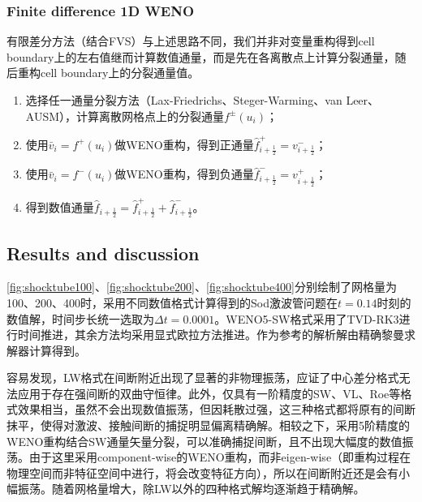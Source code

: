\documentclass[11pt]{article}
\begin{document}
\subsubsection{Finite difference 1D WENO}
有限差分方法（结合FVS）与上述思路不同，我们并非对变量重构得到cell boundary上的左右值继而计算数值通量，而是先在各离散点上计算分裂通量，随后重构cell boundary上的分裂通量值。
\begin{enumerate}
	\item 选择任一通量分裂方法（Lax-Friedrichs、Steger-Warming、van Leer、AUSM），计算离散网格点上的分裂通量$f^\pm(u_i)$；
	\item 使用$\bar{v}_i=f^+(u_i)$做WENO重构，得到正通量$\hat{f}^+_{i+\frac{1}{2}}=v^-_{i+\frac{1}{2}}$；
	\item 使用$\bar{v}_i=f^-(u_i)$做WENO重构，得到负通量$\hat{f}^-_{i+\frac{1}{2}}=v^+_{i+\frac{1}{2}}$；
	\item 得到数值通量$\hat{f}_{i+\frac{1}{2}}=\hat{f}^+_{i+\frac{1}{2}}+\hat{f}^-_{i+\frac{1}{2}}$。
\end{enumerate}

\subsection{Results and discussion}
\autoref{fig:shocktube100}、\autoref{fig:shocktube200}、\autoref{fig:shocktube400}分别绘制了网格量为100、200、400时，采用不同数值格式计算得到的Sod激波管问题在$t=0.14$时刻的数值解，时间步长统一选取为$\Delta t=0.0001$。WENO5-SW格式采用了TVD-RK3进行时间推进，其余方法均采用显式欧拉方法推进。作为参考的解析解由精确黎曼求解器计算得到。

容易发现，LW格式在间断附近出现了显著的非物理振荡，应证了中心差分格式无法应用于存在强间断的双曲守恒律。此外，仅具有一阶精度的SW、VL、Roe等格式效果相当，虽然不会出现数值振荡，但因耗散过强，这三种格式都将原有的间断抹平，使得对激波、接触间断的捕捉明显偏离精确解。相较之下，采用5阶精度的WENO重构结合SW通量矢量分裂，可以准确捕捉间断，且不出现大幅度的数值振荡。由于这里采用component-wise的WENO重构，而非eigen-wise（即重构过程在物理空间而非特征空间中进行，将会改变特征方向），所以在间断附近还是会有小幅振荡。随着网格量增大，除LW以外的四种格式解均逐渐趋于精确解。
\end{document}
